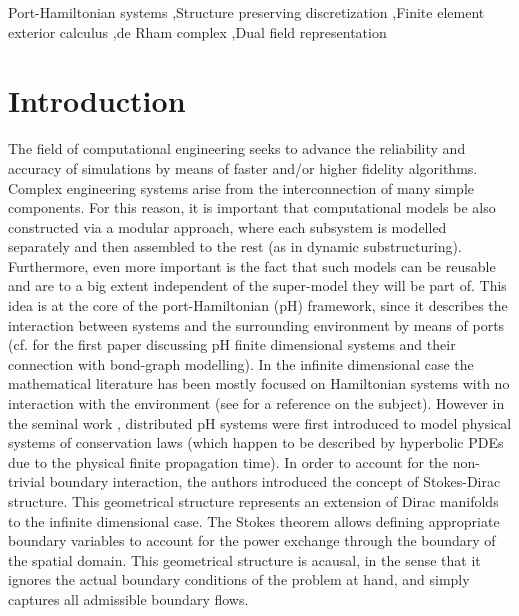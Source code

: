 \documentclass{elsarticle}
\begin{document}
\begin{frontmatter}
\begin{abstract}
		\end{abstract}
		
		\begin{keyword}
			 Port-Hamiltonian systems \sep Structure preserving discretization \sep Finite element exterior calculus \sep de Rham complex \sep Dual field representation 
		\end{keyword}
	
	
   
	\end{frontmatter}
	
\section{Introduction}

The field of computational engineering seeks to advance the reliability and accuracy of simulations by means of faster and/or higher fidelity algorithms. Complex engineering systems arise from the interconnection of many simple components. For this reason, it is important that computational models be also constructed via a modular approach, where each subsystem is modelled separately and then assembled to the rest (as in dynamic substructuring). Furthermore, even more important is the fact that such models can be reusable and are to a big extent independent of the super-model they will be part of. This idea is at the core of the port-Hamiltonian (pH) framework, since it describes the interaction between systems and the surrounding environment by means of ports (cf. \cite{maschke1993pH} for the first paper discussing pH finite dimensional systems and their connection with bond-graph modelling). In the infinite dimensional case the mathematical literature has been mostly focused on Hamiltonian systems  with no interaction with the environment (see \cite{olver1986applications} for a reference on the subject). However in the seminal work \cite{vanderSchaft2002}, distributed pH systems were first introduced to model physical systems of conservation laws (which happen to be described by hyperbolic PDEs due to the physical finite propagation time). In order to account for the non-trivial boundary interaction, the authors introduced the concept of Stokes-Dirac structure. This geometrical structure represents an extension of Dirac manifolds \cite{courant1990} to the infinite dimensional case. The Stokes theorem allows defining appropriate boundary variables to account for the power exchange through the boundary of the spatial domain. This geometrical structure is acausal, in the sense that it ignores the actual boundary conditions of the problem at hand, and simply captures all admissible boundary flows. \\
\end{document}
